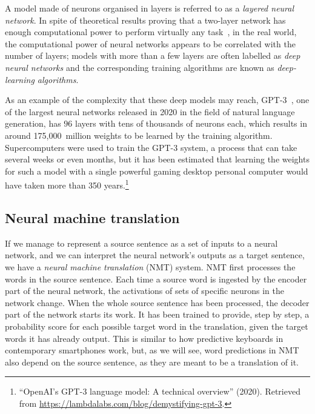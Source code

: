 \documentclass[output=paper,colorlinks,citecolor=brown]{langscibook}
\begin{document}
A model made of neurons organised in layers is referred to as a \emph{layered neural network}. In spite of theoretical results proving that a two-layer network has enough computational power to perform virtually any task~\citep{hornik91}, in the real world, the computational power of neural networks appears to be correlated with the number of layers; models with more than a few layers are often labelled as \emph{deep neural networks} and the corresponding training algorithms are known as \emph{deep-learning algorithms}.

As an example of the complexity that these deep models may reach, GPT-3~\citep{Brown2020}, one of the largest neural networks released in 2020 in the field of natural language generation, has $96$ layers with tens of thousands of neurons each, which results in around 
175,000~million weights to be learned by the training algorithm. Supercomputers were used to train the GPT-3 system, a process that can take several weeks or even months, but it has been estimated that learning the weights for such a model with a single powerful gaming desktop personal computer would have taken more than 350 years.\footnote{``OpenAI's GPT-3 language model: A technical overview'' (2020). Retrieved from \url{https://lambdalabs.com/blog/demystifying-gpt-3}.}


\subsection{Neural machine translation}
\label{ss:nmt}

If we manage to represent a source sentence as a set of inputs to a neural network, and we can interpret the neural network's outputs as a target sentence, we have a \emph{neural machine translation} (NMT) system. NMT first processes the words in the source sentence. Each time a source word is ingested by the encoder part of the neural network, the activations of sets of specific neurons in the network change. When the whole source sentence has been processed, the decoder part of the network starts its work. It has been trained to provide, step by step, a probability score for each possible target word in the translation, given the target words it has already output. This is similar to how  predictive keyboards in contemporary smartphones work, but, as we will see, word predictions in NMT also depend on the source sentence, as they are meant to be a translation of it.
\end{document}
